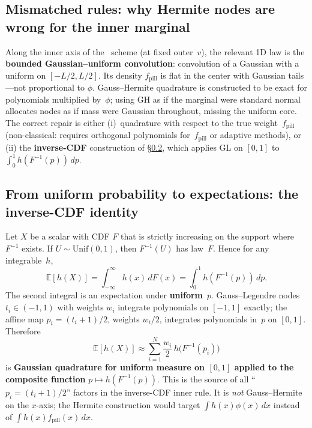 \documentclass[11pt,a4paper]{article}
\begin{document}
\subsection{Mismatched rules: why Hermite nodes are wrong for the inner marginal}
Along the inner axis of the \profileros\ scheme (at fixed outer~$v$), the relevant 1D law is the \textbf{bounded Gaussian--uniform convolution}: convolution of a Gaussian with a uniform on $[-L/2,L/2]$.
Its density $f_{\mathrm{pill}}$ is flat in the center with Gaussian tails---not proportional to $\phi$.
Gauss--Hermite quadrature is constructed to be exact for polynomials multiplied by~$\phi$; using GH as if the marginal were standard normal allocates nodes as if mass were Gaussian throughout, missing the uniform core.
The correct repair is either (i)~quadrature with respect to the true weight~$f_{\mathrm{pill}}$ (non-classical: requires orthogonal polynomials for~$f_{\mathrm{pill}}$ or adaptive methods), or (ii) the \textbf{inverse-CDF} construction of \S\ref{sec:invcdf}, which applies GL on $[0,1]$ to $\int_0^1 h(F^{-1}(p))\,dp$.

\subsection{From uniform probability to expectations: the inverse-CDF identity}
\label{sec:invcdf}
Let $X$ be a scalar with CDF $F$ that is strictly increasing on the support where $F^{-1}$ exists.
If $U\sim\mathrm{Unif}(0,1)$, then $F^{-1}(U)$ has law~$F$.
Hence for any integrable~$h$,
\begin{equation}
\label{eq:prob-transform}
  \mathbb{E}[h(X)]=\int_{-\infty}^{\infty} h(x)\,dF(x)=\int_0^1 h(F^{-1}(p))\,dp.
\end{equation}
The second integral is an expectation under \textbf{uniform}~$p$.
Gauss--Legendre nodes $t_i\in(-1,1)$ with weights $w_i$ integrate polynomials on $[-1,1]$ exactly; the affine map $p_i=(t_i+1)/2$, weights $w_i/2$, integrates polynomials in~$p$ on $[0,1]$.
Therefore
\[
  \mathbb{E}[h(X)] \approx \sum_{i=1}^N \frac{w_i}{2}\,h\bigl(F^{-1}(p_i)\bigr)
\]
is \textbf{Gaussian quadrature for uniform measure on $[0,1]$ applied to the composite function} $p\mapsto h(F^{-1}(p))$.
This is the source of all ``$p_i=(t_i+1)/2$'' factors in the inverse-CDF inner rule.
It is \emph{not} Gauss--Hermite on the $x$-axis; the Hermite construction would target $\int h(x)\phi(x)\,dx$ instead of $\int h(x)f_{\mathrm{pill}}(x)\,dx$.
\end{document}
